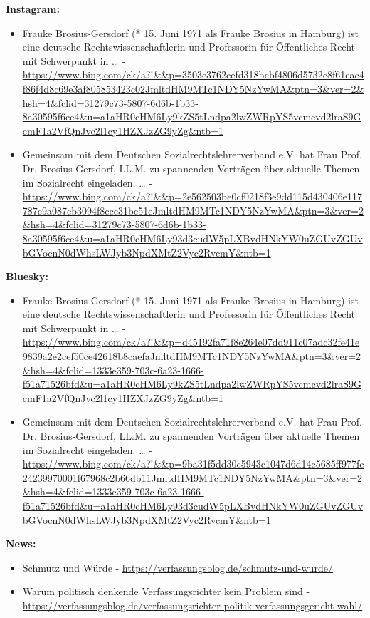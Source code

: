 \documentclass[12pt,a4paper]{article}
\begin{document}
\textbf{Instagram:}
\begin{itemize}
\item Frauke Brosius-Gersdorf (* 15. Juni 1971 als Frauke Brosius in Hamburg) ist eine deutsche Rechtswissenschaftlerin und Professorin für Öffentliches Recht mit Schwerpunkt in … - \url{https://www.bing.com/ck/a?!&&p=3503e3762cefd318bcbf4806d5732c8f61eac4f86f4d8c69e3af805853423c02JmltdHM9MTc1NDY5NzYwMA&ptn=3&ver=2&hsh=4&fclid=31279c73-5807-6d6b-1b33-8a30595f6ce4&u=a1aHR0cHM6Ly9kZS5tLndpa2lwZWRpYS5vcmcvd2lraS9GcmF1a2VfQnJvc2l1cy1HZXJzZG9yZg&ntb=1}
\item Gemeinsam mit dem Deutschen Sozialrechtslehrerverband e.V. hat Frau Prof. Dr. Brosius-Gersdorf, LL.M. zu spannenden Vorträgen über aktuelle Themen im Sozialrecht eingeladen. … - \url{https://www.bing.com/ck/a?!&&p=2e562503be0cf0218f3e9dd115d430406e117787c9a087cb3094f8ccc31bc51eJmltdHM9MTc1NDY5NzYwMA&ptn=3&ver=2&hsh=4&fclid=31279c73-5807-6d6b-1b33-8a30595f6ce4&u=a1aHR0cHM6Ly93d3cudW5pLXBvdHNkYW0uZGUvZGUvbGVocnN0dWhsLWJyb3NpdXMtZ2Vyc2RvcmY&ntb=1}
\end{itemize}

\textbf{Bluesky:}
\begin{itemize}
\item Frauke Brosius-Gersdorf (* 15. Juni 1971 als Frauke Brosius in Hamburg) ist eine deutsche Rechtswissenschaftlerin und Professorin für Öffentliches Recht mit Schwerpunkt in … - \url{https://www.bing.com/ck/a?!&&p=d45192fa71f8e264e07dd911c07adc32fe41e9839a2e2cef50ce42618b8caefaJmltdHM9MTc1NDY5NzYwMA&ptn=3&ver=2&hsh=4&fclid=1333e359-703c-6a23-1666-f51a71526bfd&u=a1aHR0cHM6Ly9kZS5tLndpa2lwZWRpYS5vcmcvd2lraS9GcmF1a2VfQnJvc2l1cy1HZXJzZG9yZg&ntb=1}
\item Gemeinsam mit dem Deutschen Sozialrechtslehrerverband e.V. hat Frau Prof. Dr. Brosius-Gersdorf, LL.M. zu spannenden Vorträgen über aktuelle Themen im Sozialrecht eingeladen. … - \url{https://www.bing.com/ck/a?!&&p=9ba31f5dd30c5943c1047d6d14e5685ff977fc24239970001f67968c2b66db11JmltdHM9MTc1NDY5NzYwMA&ptn=3&ver=2&hsh=4&fclid=1333e359-703c-6a23-1666-f51a71526bfd&u=a1aHR0cHM6Ly93d3cudW5pLXBvdHNkYW0uZGUvZGUvbGVocnN0dWhsLWJyb3NpdXMtZ2Vyc2RvcmY&ntb=1}
\end{itemize}

\textbf{News:}
\begin{itemize}
\item Schmutz und Würde - \url{https://verfassungsblog.de/schmutz-und-wurde/}
\item Warum politisch denkende Verfassungsrichter kein Problem sind - \url{https://verfassungsblog.de/verfassungsrichter-politik-verfassungsgericht-wahl/}
\end{itemize}
\end{document}
